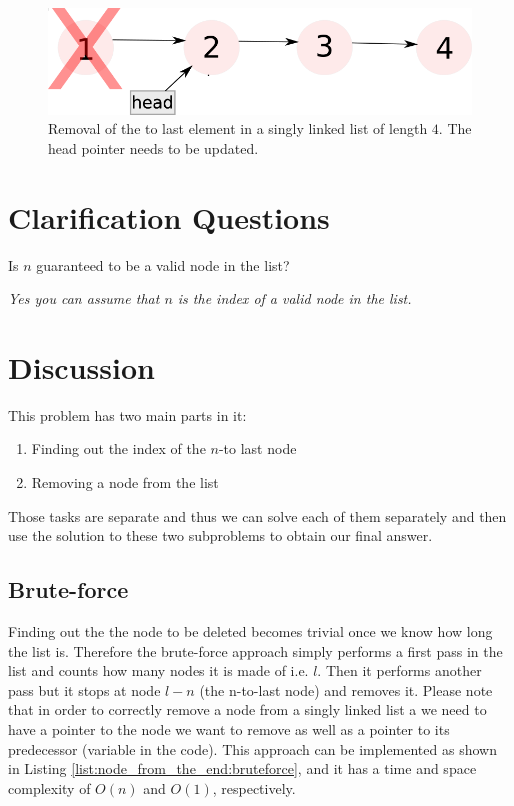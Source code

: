 \begin{figure}
	\label{fig:node_from_the_end:example2}
	\centering
	\includegraphics[scale=1.0]{sources/node_from_the_end/images/example2}
	\caption{Removal of the  to last element in a singly linked list of length $4$. The head pointer needs to be updated.}
\end{figure}


\section{Clarification Questions}

\begin{QandA}
	\item \begin{questionitem} \begin{question} Is $n$ guaranteed to be a valid node in the list?  \end{question} 	 
    \begin{answered}
		\textit{Yes you can assume that $n$ is the index of a valid node in the list.}
	\end{answered} \end{questionitem}
\end{QandA}

\section{Discussion}
\label{node_from_the_end:sec:discussion}
This problem has two main parts in it: 
\begin{enumerate}
	\item Finding out the index of the $n$-to last node
	\item Removing a node from the list
\end{enumerate}
Those tasks are separate and thus we can solve each of them separately and then use the solution to these two subproblems to obtain our final answer.

\subsection{Brute-force}
\label{node_from_the_end:sec:bruteforce}
Finding out the the node to be deleted becomes trivial once we know how long the list is. Therefore the brute-force approach simply performs a first pass in the list and counts how many nodes it is made of i.e. $l$. Then it performs another pass but it stops at node $l-n$ (the n-to-last node) and removes it.
Please note that in order to correctly remove a node from a singly linked list a we need to have a pointer to the node we want to remove as well as a pointer to its predecessor (variable  in the code). This approach can be implemented as shown in Listing \ref{list:node_from_the_end:bruteforce}, and it has a time and space complexity of  $O(n)$ and $O(1)$, respectively.


